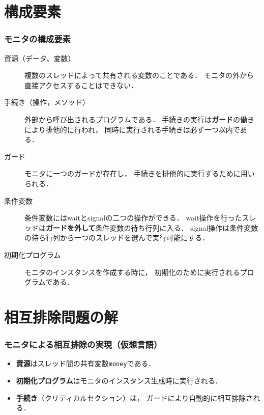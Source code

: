 \documentclass[unicode,handout]{beamer}                   %
\begin{document}
\section{構成要素}
\begin{frame}
  \frametitle{モニタの構成要素}
\begin{description}
\item [資源（データ、変数）]
複数のスレッドによって共有される変数のことである．
モニタの外から直接アクセスすることはできない．

\item [手続き（操作，メソッド）]
外部から呼び出されるプログラムである．
手続きの実行は{\bf ガード}の働きにより排他的に行われ，
同時に実行される手続きは必ず一つ以内である．

\item [ガード]
モニタに一つのガードが存在し，
手続きを排他的に実行するために用いられる．

\item [条件変数]
条件変数にはwaitとsignalの二つの操作ができる．
wait操作を行ったスレッドは{\bf ガードを外して}条件変数の待ち行列に入る．
signal操作は条件変数の待ち行列から一つのスレッドを選んで実行可能にする．

\item [初期化プログラム]
モニタのインスタンスを作成する時に，
初期化のために実行されるプログラムである．
\end{description}
\end{frame}

\section{相互排除問題の解}
\begin{frame}
  \frametitle{モニタによる相互排除の実現（仮想言語）}

  \begin{itemize}
  \item {\bf 資源}はスレッド間の共有変数{\tt money}である．
  \item {\bf 初期化プログラム}はモニタのインスタンス生成時に実行される．
  \item {\bf 手続き}（クリティカルセクション）は，
    ガードにより自動的に相互排除される．
  \end{itemize}
\end{frame}
\end{document}
